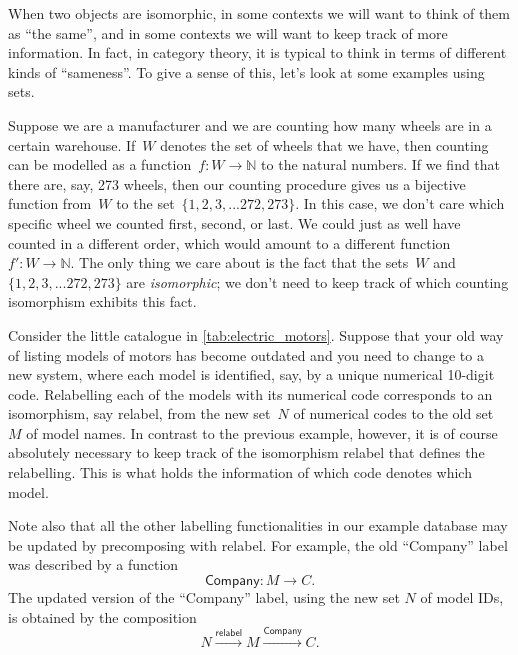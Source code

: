 When two objects are isomorphic, in some contexts we will want to think of them as ``the same'', and in some contexts we will want to keep track of more information. In fact, in category theory, it is typical to think in terms of different kinds of ``sameness''. To give a sense of this, let's look at some examples using sets.

\begin{example}[Sizes]
Suppose we are a manufacturer and we are counting how many wheels are in a certain warehouse. If~$W$ denotes the set of wheels that we have, then counting can be modelled as a function~$f\colon W \to \mathbb{N}$ to the natural numbers. If we find that there are, say, 273 wheels, then our counting procedure gives us a bijective function from~$W$ to the set~$\{1, 2, 3,... 272, 273 \}$. In this case, we don't care which specific wheel we counted first, second, or last. We could just as well have counted in a different order, which would amount to a different function~$f'\colon W \to \mathbb{N}$. The only thing we care about is the fact that the sets~$W$ and~$\{1, 2, 3,... 272, 273 \}$ are \emph{isomorphic}; we don't need to keep track of which counting isomorphism exhibits this fact.
\end{example}


\begin{example}[Relabelling]
Consider the little catalogue in \cref{tab:electric_motors}. Suppose that your old way of listing models of motors has become outdated and you need to change to a new system, where each model is identified, say, by a unique numerical 10-digit code. Relabelling each of the models with its numerical code corresponds to an isomorphism, say \textsf{relabel}, from the new set~$N$ of numerical codes to the old set~$M$ of model names. In contrast to the previous example, however, it is of course absolutely necessary to keep track of the isomorphism \textsf{relabel} that defines the relabelling. This is what holds the information of which code denotes which model.

Note also that all the other labelling functionalities in our example database may be updated by precomposing with \textsf{relabel}. For example, the old ``Company'' label was described by a function
\begin{equation*}
\textsf{Company}\colon M \to C.
\end{equation*}
The updated version of the ``Company'' label, using the new set $N$ of model IDs, is obtained by the composition
\begin{equation*}
N \overset{\textsf{relabel}}{\longrightarrow} M \overset{\textsf{Company}}{\longrightarrow} C.
\end{equation*}
\end{example}




